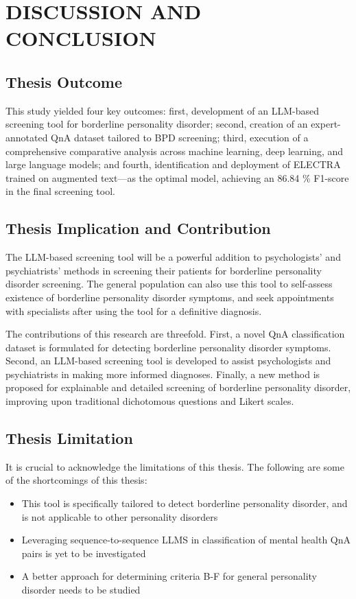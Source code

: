 \chapter{DISCUSSION AND CONCLUSION}
\onehalfspacing
\label{chap:discussion}
\vspace{-3em}
\section{Thesis Outcome}
This study yielded four key outcomes: first, development of an LLM-based screening tool for borderline personality disorder; second, creation of an expert-annotated QnA dataset tailored to BPD screening; third, execution of a comprehensive comparative analysis across machine learning, deep learning, and large language models; and fourth, identification and deployment of ELECTRA trained on augmented text—as the optimal model, achieving an 86.84 \% F1-score in the final screening tool.

\section{Thesis Implication and Contribution}
 The LLM-based screening tool will be a powerful addition to psychologists' and psychiatrists' methods in screening their patients for borderline personality disorder screening. The general population can also use this tool to self-assess existence of borderline personality disorder symptoms, and seek appointments with specialists after using the tool for a definitive diagnosis.

The contributions of this research are threefold. First, a novel QnA classification dataset is formulated for detecting borderline personality disorder symptoms. Second, an LLM-based screening tool is developed to assist psychologists and psychiatrists in making more informed diagnoses. Finally, a new method is proposed for explainable and detailed screening of borderline personality disorder, improving upon traditional dichotomous questions and Likert scales.

\section{Thesis Limitation}

It is crucial to acknowledge the limitations of this thesis. The following are some of the shortcomings of this thesis:
\begin{itemize}
  \item This tool is specifically tailored to detect borderline personality disorder, and is not applicable to other personality disorders
  \item Leveraging sequence-to-sequence LLMS in classification of mental health QnA pairs is yet to be investigated
  \item A better approach for determining criteria B-F for general personality disorder needs to be studied
\end{itemize}

